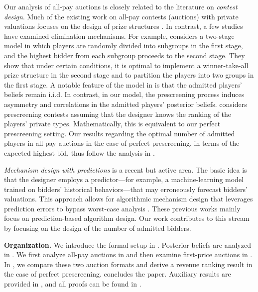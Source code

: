Our analysis of all-pay auctions is closely related to the literature on \textit{contest design}. Much of the existing work on all-pay contests (auctions) with private valuations focuses on the design of prize structures \citep{Moldovanu_2001_AER_WTA_Optimial, Liu_2023_optimal_reward_negativeprizes, Jason_Optimal_Crowdsourcing_Contest}. In contrast, a few studies have examined elimination mechanisms. For example, \citet{moldovanu_2006_contest_architecture} considers a two-stage model in which players are randomly divided into subgroups in the first stage, and the highest bidder from each subgroup proceeds to the second stage. They show that under certain conditions, it is optimal to implement a winner-take-all prize structure in the second stage and to partition the players into two groups in the first stage. A notable feature of the model in \citet{moldovanu_2006_contest_architecture} is that the admitted players' beliefs remain i.i.d. In contrast, in our model, the prescreening process induces asymmetry and correlations in the admitted players' posterior beliefs.
\citet{sun_2024_contests} considers prescreening contests assuming that the designer knows the ranking of the players' private types. Mathematically, this is equivalent to our perfect prescreening setting. Our results regarding the optimal number of admitted players in all-pay auctions in the case of perfect prescreening, in terms of the expected highest bid, thus follow the analysis in \citet{sun_2024_contests}.



\textit{Mechanism design with predictions} is a recent but active area. The basic idea is that the designer employs a predictor—for example, a machine-learning model trained on bidders' historical behaviors—that may erroneously forecast bidders' valuations. This approach allows for algorithmic mechanism design that leverages prediction errors to bypass worst-case analysis \citep{munoz_2017_auctions_predictions,xu_2022_mechanismdesign_predictions,balkanski_2023_online_mechanism_predictions,lu_2024_competitiveauctions_predictions}.
These previous works mainly focus on prediction-based algorithm design.
Our work contributes to this stream by focusing on the design of the number of admitted bidders.


\noindent
\textbf{Organization.} We introduce the formal setup in . Posterior beliefs are analyzed in . We first analyze all-pay auctions in  and then examine first-price auctions in . In , we compare these two auction formats and derive a revenue ranking result in the case of perfect prescreening.  concludes the paper. Auxiliary results are provided in , and all proofs can be found in .

